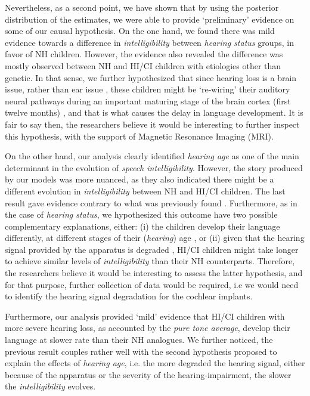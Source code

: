 Nevertheless, as a second point, we have shown that by using the posterior distribution of the estimates, we were able to provide `preliminary' evidence on some of our causal hypothesis. On the one hand, we found there was mild evidence towards a difference in \textit{intelligibility} between \textit{hearing status} groups, in favor of NH children. However, the evidence also revealed the difference was mostly observed between NH and HI/CI children with etiologies other than genetic. In that sense, we further hypothesized that since hearing loss is a brain issue, rather than ear issue \cite{Flexer_2011}, these children might be `re-wiring' their auditory neural pathways during an important maturing stage of the brain cortex (first twelve months) \cite{Flexer_2011}, and that is what causes the delay in language development. It is fair to say then, the researchers believe it would be interesting to further inspect this hypothesis, with the support of Magnetic Resonance Imaging (MRI).

On the other hand, our analysis clearly identified \textit{hearing age} as one of the main determinant in the evolution of \textit{speech intelligibility}. However, the story produced by our models was more nuanced, as they also indicated there might be a different evolution in \textit{intelligibility} between NH and HI/CI children. The last result gave evidence contrary to what was previously found \cite{Boonen_et_al_2021}. Furthermore, as in the case of \textit{hearing status}, we hypothesized this outcome have two possible complementary explanations, either: (i) the children develop their language differently, at different stages of their (\textit{hearing}) age \cite{Flexer_2011}, or (ii) given that the hearing signal provided by the apparatus is degraded \cite{Drennan_et_al_2008}, HI/CI children might take longer to achieve similar levels of \textit{intelligibility} than their NH counterparts. Therefore, the researchers believe it would be interesting to assess the latter hypothesis, and for that purpose, further collection of data would be required, i.e we would need to identify the hearing signal degradation for the cochlear implants.

Furthermore, our analysis provided `mild' evidence that HI/CI children with more severe hearing loss, as accounted by the \textit{pure tone average}, develop their language at slower rate than their NH analogues. We further noticed, the previous result couples rather well with the second hypothesis proposed to explain the effects of \textit{hearing age}, i.e. the more degraded the hearing signal, either because of the apparatus or the severity of the hearing-impairment, the slower the \textit{intelligibility} evolves.

